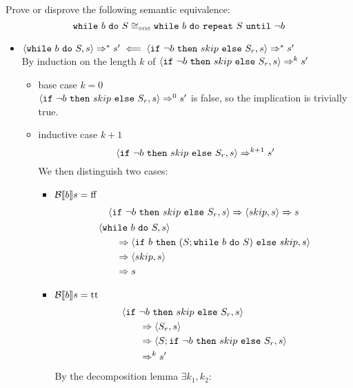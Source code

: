 \begin{exercise}{
    Prove or disprove the following semantic equivalence:
    \[ \texttt{while}\ b\ \texttt{do}\ S \cong_{\text{\tiny SOS}} \texttt{while}\ b\ \texttt{do}\ \texttt{repeat}\ S\ \texttt{until}\ \neg b  \]\vspace*{-0.6cm}
}
\begin{itemize}
        \item $\left<\texttt{while}\ b\ \texttt{do}\ S, s\right> \Rightarrow^* s' \impliedby \left<\texttt{if}\ \neg b\ \texttt{then}\ skip\ \texttt{else}\ S_r, s\right> \Rightarrow^* s'$ \\
            By induction on the length $k$ of $\left<\texttt{if}\ \neg b\ \texttt{then}\ skip\ \texttt{else}\ S_r, s\right> \Rightarrow^k s'$
            \begin{itemize}
                \item base case $k=0$ \\
                $\left<\texttt{if}\ \neg b\ \texttt{then}\ skip\ \texttt{else}\ S_r, s\right> \Rightarrow^0 s'$ is false, so the implication is trivially true.
                \item inductive case $k+1$ \vspace*{-0.3cm}
                \[ \left<\texttt{if}\ \neg b\ \texttt{then}\ skip\ \texttt{else}\ S_r, s\right> \Rightarrow^{k+1} s' \]
                We then distinguish two cases:
                \begin{itemize}
                    \item $\mathcal{B} \llbracket  b \rrbracket s = \text{ff}$
                    \begin{gather*}
                        \left<\texttt{if}\ \neg b\ \texttt{then}\ skip\ \texttt{else}\ S_r, s\right>
                        \Rightarrow
                        \left<skip, s\right>
                        \Rightarrow s
                        \\
                        \begin{align*}
                            &\left<\texttt{while}\ b\ \texttt{do}\ S, s\right>
                            \\&\qquad\Rightarrow \left<\texttt{if}\ b\ \texttt{then}\ (S; \texttt{while}\ b\ \texttt{do}\ S)\ \texttt{else}\ skip, s\right>
                            \\&\qquad\Rightarrow \left<skip, s\right>
                            \\&\qquad\Rightarrow s
                        \end{align*}
                    \end{gather*}
                    \item $\mathcal{B} \llbracket  b \rrbracket s = \text{tt}$
                    \begin{align*}
                        &\left<\texttt{if}\ \neg b\ \texttt{then}\ skip\ \texttt{else}\ S_r, s\right>
                        \\&\qquad\Rightarrow \left<S_r, s\right>
                        \\&\qquad\Rightarrow \left<S; \texttt{if}\ \neg b\ \texttt{then}\ skip\ \texttt{else}\ S_r, s\right>
                        \\&\qquad\Rightarrow^k s'
                    \end{align*}
                    By the decomposition lemma $\exists k_1, k_2 :$

\end{itemize}
\end{itemize}
\end{itemize}
\end{exercise}
